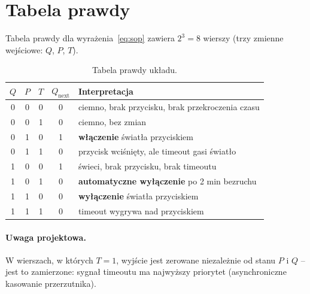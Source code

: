 \section{Tabela prawdy}
\label{sec:tabela}

Tabela prawdy dla wyrażenia~\eqref{eq:sop} zawiera $2^3 = 8$ wierszy
(trzy zmienne wejściowe: $Q$, $P$, $T$).

\begin{table}[H]
\centering
\caption{Tabela prawdy układu.}
\label{tab:truth}
\begin{tabular}{ccc|c|l}
\toprule
$Q$ & $P$ & $T$ & $Q_{\text{next}}$ & Interpretacja \\
\midrule
0 & 0 & 0 & 0 & ciemno, brak przycisku, brak przekroczenia czasu \\
0 & 0 & 1 & 0 & ciemno, bez zmian \\
0 & 1 & 0 & 1 & \textbf{włączenie} światła przyciskiem \\
0 & 1 & 1 & 0 & przycisk wciśnięty, ale timeout gasi światło \\
1 & 0 & 0 & 1 & świeci, brak przycisku, brak timeoutu \\
1 & 0 & 1 & 0 & \textbf{automatyczne wyłączenie} po 2 min bezruchu \\
1 & 1 & 0 & 0 & \textbf{wyłączenie} światła przyciskiem \\
1 & 1 & 1 & 0 & timeout wygrywa nad przyciskiem \\
\bottomrule
\end{tabular}
\end{table}

\paragraph{Uwaga projektowa.} W wierszach, w których $T=1$, wyjście
jest zerowane niezależnie od stanu $P$ i $Q$ – jest to zamierzone:
sygnał timeoutu ma najwyższy priorytet (asynchroniczne kasowanie
przerzutnika).